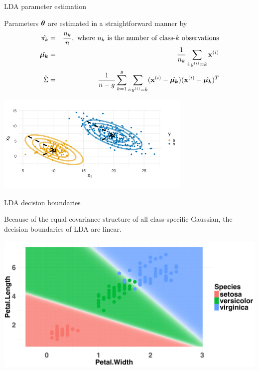 \documentclass[11pt,compress,t,notes=noshow, xcolor=table]{beamer}
\begin{document}
\begin{vbframe}{LDA parameter estimation}
  
Parameters $\bm{\theta}$ are estimated in a straightforward manner by
\begin{eqnarray*}
\hat{\pi_{k}} &=& \frac{n_k}{n},\text{ where $n_k$ is the number of class-$k$ observations} \\
\hat{\bm{\mu_{k}}} &=& \frac{1}{n_k}\sum_{i: y^{(i)} = k} \mathbf{x}^{(i)} \\
\hat{\Sigma} &=& \frac{1}{n - g} \sum\limits_{k=1}^g \sum_{i: y^{(i)} = k} (\mathbf{x}^{(i)} - \hat{\bm{\mu_{k}}}) (\mathbf{x}^{(i)} - \hat{\bm{\mu_{k}}}) ^T
\end{eqnarray*}

\vspace{-0.9em}
\begin{center}
\includegraphics[width=0.70\textwidth, clip=true, trim={0 75 0 45}]{figure/disc_analysis-lda_2.png}
\end{center}

\end{vbframe}

\begin{vbframe}{LDA decision boundaries}

Because of the equal covariance structure of all class-specific Gaussian, the decision boundaries of LDA are linear.

\begin{center}
\includegraphics[width=\textwidth, clip=true, trim={0 0 0 0}]{figure/disc_db-lda.png}
\end{center}

\end{vbframe}
\end{document}
